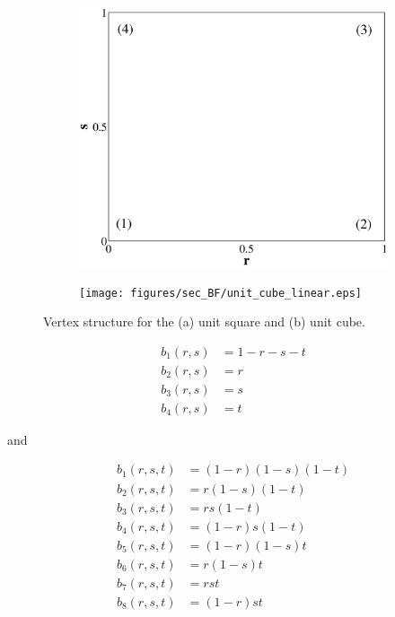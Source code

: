 \begin{figure}
\centering
	\begin{subfigure}[b]{0.45\textwidth}
		\centering
		\label{subfig::unit_square}
		\includegraphics[width=\textwidth]{figures/sec_BF/unit_square_linear.eps}
		\caption{}
	\end{subfigure}
	\hfill
	\begin{subfigure}[b]{0.45\textwidth}
		\centering
		\label{subfig::unit_cube}
		\texttt{[image: figures/sec\_BF/unit\_cube\_linear.eps]}
		\caption{}
	\end{subfigure}
\caption{Vertex structure for the (a) unit square and (b) unit cube.}
\label{fig::BF_3D_unit_tet_cube}
\end{figure}

\begin{equation}
\label{eq::3D_lin_basis_functions}
\begin{aligned}
	b_1(r,s) & = 1-r-s-t \\
	b_2(r,s) & = r \\
	b_3(r,s) & = s \\
	b_4(r,s) & = t
\end{aligned}
\end{equation}

\noindent and

\begin{equation}
\label{eq::TriL_basis_functions}
\begin{aligned}
	b_1(r,s,t) & = (1-r)(1-s)(1-t) \\
	b_2(r,s,t) & = r(1-s)(1-t) \\
	b_3(r,s,t) & = rs(1-t) \\
	b_4(r,s,t) & = (1-r)s(1-t) \\
	b_5(r,s,t) & = (1-r)(1-s)t \\
	b_6(r,s,t) & = r(1-s)t \\
	b_7(r,s,t) & = rst \\
	b_8(r,s,t) & = (1-r)st \\
\end{aligned}
\end{equation}


